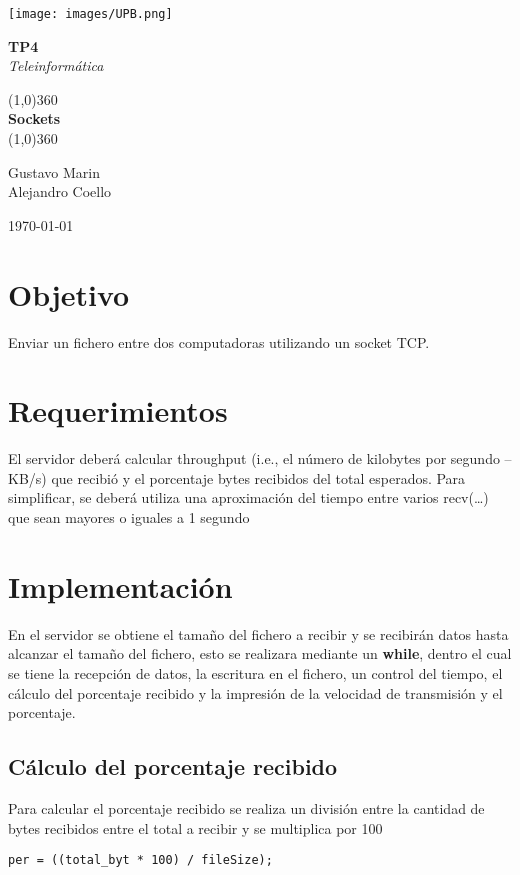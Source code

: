 \documentclass[12pt, letterpaper]{article}
\begin{document}
	\begin{titlepage}
		\begin{center}
			\vspace*{2cm}
			
			\texttt{[image: images/UPB.png]}
			\vfill
			
			\Huge{\textbf{TP4}}\\[5mm]
			
			\huge{\slshape{Teleinform\'atica}}
			\vfill
			
			\line(1,0){360}\\[3mm]
			\Huge{\textbf{Sockets}}\\[1mm] 
			\line(1,0){360}\\[2cm]
			\begin{center}
				\Large{Gustavo Marin}
				\\
				\Large{Alejandro Coello}
			\end{center}
			
			\vfill
			\large{\today}
		\end{center}
	\end{titlepage}
\section{Objetivo}
\noindent Enviar un fichero entre dos computadoras utilizando un socket TCP.
\section{Requerimientos}
\noindent El servidor deberá calcular throughput (i.e., el número de kilobytes por segundo – KB/s) que recibió y el porcentaje bytes recibidos del total esperados. Para simplificar, se deberá utiliza una aproximación del tiempo entre varios recv(…) que sean mayores o iguales a 1 segundo

\section{Implementaci\'on}
\noindent En el servidor se obtiene el tamaño del fichero a recibir y se recibir\'an datos hasta alcanzar el tamaño del fichero, esto se realizara mediante un {\selectfont\textbf{while}}, dentro el cual se tiene la recepci\'on de datos, la escritura en el fichero, un control del tiempo, el c\'alculo del porcentaje recibido y la impresi\'on de la velocidad de transmisi\'on y el porcentaje.
\subsection{C\'alculo del porcentaje recibido}
\noindent Para calcular el porcentaje recibido se realiza un divisi\'on entre la cantidad de bytes recibidos entre el total a recibir y se multiplica por 100
\begin{verbatim}
per = ((total_byt * 100) / fileSize);
\end{verbatim}
\end{document}
